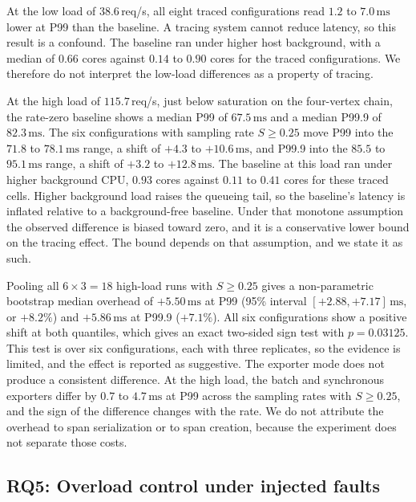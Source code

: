 At the low load of $38.6$\,req/s, all eight traced configurations read $1.2$ to $7.0\,\mathrm{ms}$ lower at P99 than the baseline. A tracing system cannot reduce latency, so this result is a confound. The baseline ran under higher host background, with a median of $0.66$ cores against $0.14$ to $0.90$ cores for the traced configurations. We therefore do not interpret the low-load differences as a property of tracing.

At the high load of $115.7$\,req/s, just below saturation on the four-vertex chain, the rate-zero baseline shows a median P99 of $67.5\,\mathrm{ms}$ and a median P99.9 of $82.3\,\mathrm{ms}$. The six configurations with sampling rate $S\ge0.25$ move P99 into the $71.8$ to $78.1\,\mathrm{ms}$ range, a shift of $+4.3$ to $+10.6\,\mathrm{ms}$, and P99.9 into the $85.5$ to $95.1\,\mathrm{ms}$ range, a shift of $+3.2$ to $+12.8\,\mathrm{ms}$. The baseline at this load ran under higher background CPU, $0.93$ cores against $0.11$ to $0.41$ cores for these traced cells. Higher background load raises the queueing tail, so the baseline's latency is inflated relative to a background-free baseline. Under that monotone assumption the observed difference is biased toward zero, and it is a conservative lower bound on the tracing effect. The bound depends on that assumption, and we state it as such.

Pooling all $6\times3=18$ high-load runs with $S\ge0.25$ gives a non-parametric bootstrap median overhead of $+5.50\,\mathrm{ms}$ at P99 (95\% interval $[+2.88, +7.17]\,\mathrm{ms}$, or $+8.2\%$) and $+5.86\,\mathrm{ms}$ at P99.9 ($+7.1\%$). All six configurations show a positive shift at both quantiles, which gives an exact two-sided sign test with $p=0.03125$. This test is over six configurations, each with three replicates, so the evidence is limited, and the effect is reported as suggestive. The exporter mode does not produce a consistent difference. At the high load, the batch and synchronous exporters differ by $0.7$ to $4.7\,\mathrm{ms}$ at P99 across the sampling rates with $S\ge0.25$, and the sign of the difference changes with the rate. We do not attribute the overhead to span serialization or to span creation, because the experiment does not separate those costs.



\subsection{RQ5: Overload control under injected faults}
\label{sec:rq5}

